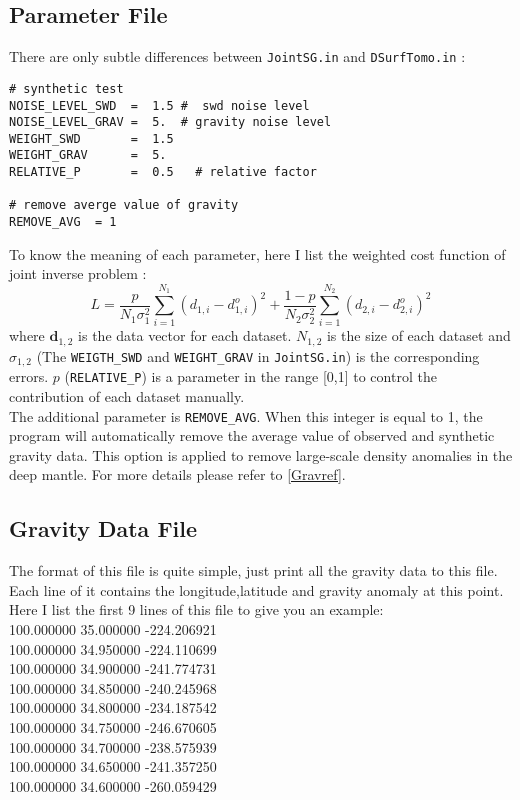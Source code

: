\documentclass[UTF8]{article}
\begin{document}
\subsection{Parameter File}
There are only subtle differences between \verb!JointSG.in! and \verb!DSurfTomo.in! : 
\begin{lstlisting}
# synthetic test 
NOISE_LEVEL_SWD  =  1.5 #  swd noise level
NOISE_LEVEL_GRAV =  5.  # gravity noise level 
WEIGHT_SWD       =  1.5
WEIGHT_GRAV      =  5.
RELATIVE_P       =  0.5   # relative factor

# remove averge value of gravity 
REMOVE_AVG  = 1 
\end{lstlisting}

To know the meaning of each parameter, here I list the weighted cost function of joint inverse 
problem \citep{Julia2000}:
\[
    L = \frac{p}{N_1 \sigma_1^2}\sum_{i=1}^{N_1} (d_{1,i}- 
        d_{1,i}^o)^2 +   
        \frac{1-p}{N_2 \sigma_2^2} \sum_{i=1}^{N_2}
        (d_{2,i}- d_{2,i}^o)^2 \tag{1}
\]
where $\mathbf{d}_{1,2}$ is the data vector for each dataset. $N_{1,2}$
is the size of each dataset and $\sigma_{1,2}$ (The \texttt{WEIGTH\_SWD} and \texttt{WEIGHT\_GRAV} in \texttt{JointSG.in}) is the corresponding
errors. $p$ (\texttt{RELATIVE\_P}) is a parameter in the range [0,1] to control the contribution
of each dataset manually. \\

The additional parameter is \texttt{REMOVE\_AVG}. When this integer is equal to 1, the program will automatically 
remove the average value of observed and synthetic gravity data. This option is applied to remove large-scale density anomalies 
in the deep mantle. For more details please refer to \ref{Gravref}.

\subsection{Gravity Data File}
The format of this file is quite simple, just print all 
the gravity data to this file. Each line of it contains 
the longitude,latitude and gravity anomaly at this point. \\

Here I list the first 9 lines of this file to give you
an example:\\
100.000000 35.000000 -224.206921\\
100.000000 34.950000 -224.110699\\
100.000000 34.900000 -241.774731\\
100.000000 34.850000 -240.245968\\
100.000000 34.800000 -234.187542\\
100.000000 34.750000 -246.670605\\
100.000000 34.700000 -238.575939\\
100.000000 34.650000 -241.357250\\
100.000000 34.600000 -260.059429\\
\end{document}

